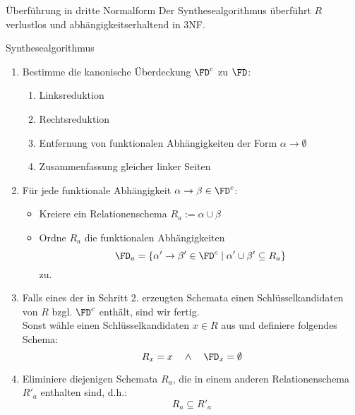 \begin{algo}{Überführung in dritte Normalform}
    Der Synthesealgorithmus überführt $R$ verlustlos und abhängigkeitserhaltend in 3NF.
\end{algo}

\begin{algo}{Synthesealgorithmus}
    \begin{enumerate}
        \item Bestimme die kanonische Überdeckung $\FD^c$ zu $\FD$:
              \begin{enumerate}
                  \item Linksreduktion
                  \item Rechtsreduktion
                  \item Entfernung von funktionalen Abhängigkeiten der Form $\alpha \to \emptyset$
                  \item Zusammenfassung gleicher linker Seiten
              \end{enumerate}
        \item Für jede funktionale Abhängigkeit $\alpha \to \beta \in \FD^c$:
              \begin{itemize}
                  \item Kreiere ein Relationenschema $R_a := \alpha \cup \beta$
                  \item Ordne $R_a$ die funktionalen Abhängigkeiten
                        \[
                            \FD_a = \{ \alpha' \to \beta' \in \FD^c \mid \alpha' \cup \beta' \subseteq R_a \}
                        \]
                        zu.
              \end{itemize}
        \item Falls eines der in Schritt 2. erzeugten Schemata einen Schlüsselkandidaten von $R$ bzgl. $\FD^c$ enthält, sind wir fertig. \\
              Sonst wähle einen Schlüsselkandidaten $x \in R$ aus und definiere folgendes Schema:
              \[
                  R_x = x \quad \land \quad \FD_x = \emptyset
              \]
        \item Eliminiere diejenigen Schemata $R_a$, die in einem anderen Relationenschema $R'_a$ enthalten sind, d.h.:
              \[
                  R_a \subseteq R'_a
              \]
    \end{enumerate}
\end{algo}

